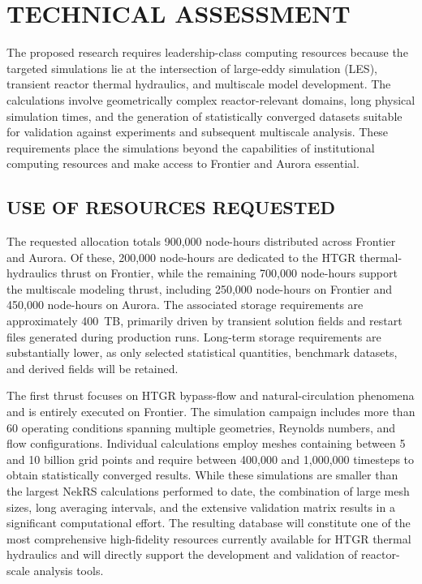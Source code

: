 \vspace{-.25in}
\section*{TECHNICAL ASSESSMENT}
\vspace{-.0in}

The proposed research requires leadership-class computing resources because the targeted simulations lie at the intersection of large-eddy simulation (LES), transient reactor thermal hydraulics, and multiscale model development. The calculations involve geometrically complex reactor-relevant domains, long physical simulation times, and the generation of statistically converged datasets suitable for validation against experiments and subsequent multiscale analysis. These requirements place the simulations beyond the capabilities of institutional computing resources and make access to Frontier and Aurora essential.

\subsection*{USE OF RESOURCES REQUESTED}
\vspace{-.2in}

The requested allocation totals 900,000 node-hours distributed across Frontier and Aurora. Of these, 200,000 node-hours are dedicated to the HTGR thermal-hydraulics thrust on Frontier, while the remaining 700,000 node-hours support the multiscale modeling thrust, including 250,000 node-hours on Frontier and 450,000 node-hours on Aurora. The associated storage requirements are approximately 400~TB, primarily driven by transient solution fields and restart files generated during production runs. Long-term storage requirements are substantially lower, as only selected statistical quantities, benchmark datasets, and derived fields will be retained.

The first thrust focuses on HTGR bypass-flow and natural-circulation phenomena and is entirely executed on Frontier. The simulation campaign includes more than 60 operating conditions spanning multiple geometries, Reynolds numbers, and flow configurations. Individual calculations employ meshes containing between 5 and 10 billion grid points and require between 400,000 and 1,000,000 timesteps to obtain statistically converged results. While these simulations are smaller than the largest NekRS calculations performed to date, the combination of large mesh sizes, long averaging intervals, and the extensive validation matrix results in a significant computational effort. The resulting database will constitute one of the most comprehensive high-fidelity resources currently available for HTGR thermal hydraulics and will directly support the development and validation of reactor-scale analysis tools.

